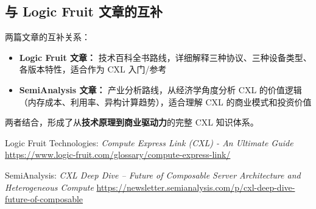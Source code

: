 \documentclass[12pt,a4paper]{article}
\begin{document}
\subsection{与 Logic Fruit 文章的互补}

\begin{analysisbox}
两篇文章的互补关系：

\begin{itemize}
    \item \textbf{Logic Fruit 文章：} 技术百科全书路线，详细解释三种协议、三种设备类型、各版本特性，适合作为 CXL 入门/参考
    \item \textbf{SemiAnalysis 文章：} 产业分析路线，从经济学角度分析 CXL 的价值逻辑（内存成本、利用率、异构计算趋势），适合理解 CXL 的商业模式和投资价值
\end{itemize}

两者结合，形成了从\textbf{技术原理到商业驱动力}的完整 CXL 知识体系。
\end{analysisbox}

\begin{tcolorbox}[title=参考来源]
\begin{enumerate}[label={[\arabic*]}]
    \item Logic Fruit Technologies: \textit{Compute Express Link (CXL) - An Ultimate Guide}\newline
    \url{https://www.logic-fruit.com/glossary/compute-express-link/}
    \item SemiAnalysis: \textit{CXL Deep Dive – Future of Composable Server Architecture and Heterogeneous Compute}\newline
    \url{https://newsletter.semianalysis.com/p/cxl-deep-dive-future-of-composable}
\end{enumerate}
\end{tcolorbox}
\end{document}
